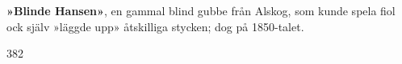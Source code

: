 \textbf{»Blinde Hansen»}, en gammal blind gubbe från Alskog, som kunde spela
fiol ock själv »läggde upp» åtskilliga stycken; dog på 1850-talet.

382 
